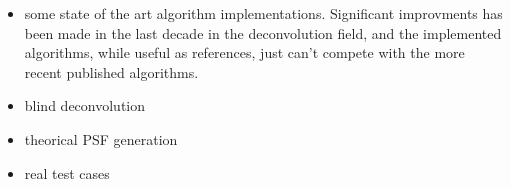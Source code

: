 \documentclass{InsightArticle}
\begin{document}
\begin{itemize}
 \item some state of the art algorithm implementations. Significant improvments has been made in the last decade
in the deconvolution field, and the implemented algorithms, while useful as references, just can't compete with the
more recent published algorithms.
 \item blind deconvolution
 \item theorical PSF generation
 \item real test cases
\end{itemize}










\appendix





\nocite{ITKSoftwareGuide}
\end{document}
